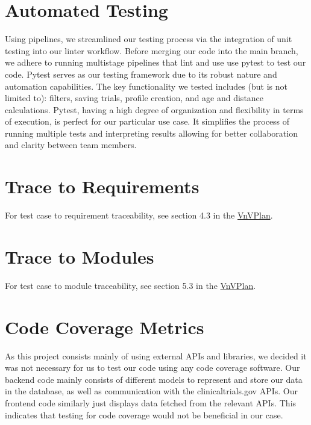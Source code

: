 \documentclass[12pt, titlepage]{article}
\begin{document}
\section{Automated Testing}
Using pipelines, we streamlined our testing process via the integration of unit 
testing into our linter workflow. Before merging our code into the main branch, we adhere
to running multistage pipelines that lint and use use pytest to test our code.
Pytest serves as our testing framework
due to its robust nature and automation capabilities. The key functionality we tested includes (but is not limited to):
filters, saving trials, profile creation, and age and distance calculations. Pytest, having a high degree of organization and flexibility 
in terms of execution, is perfect
for our particular use case. It simplifies the process of running multiple tests and interpreting results
allowing for better collaboration and clarity between team members. 


\section{Trace to Requirements}

For test case to requirement traceability, see section 4.3 in the \href{https://github.com/davimang/REACH/blob/main/docs/VnVPlan/VnVPlan.pdf}{VnVPlan}.
\section{Trace to Modules}		
For test case to module traceability, see section 5.3 in the \href{https://github.com/davimang/REACH/blob/main/docs/VnVPlan/VnVPlan.pdf}{VnVPlan}.

\section{Code Coverage Metrics}

As this project consists mainly of using external APIs and libraries, we decided it was not necessary 
for us to test our code using any code coverage software. Our backend code mainly consists of different 
models to represent and store our data in the database, as well as communication with the clinicaltrials.gov APIs.
Our frontend code similarly just displays data fetched from the relevant APIs. This indicates that testing for code
coverage would not be beneficial in our case.


%
\end{document}
